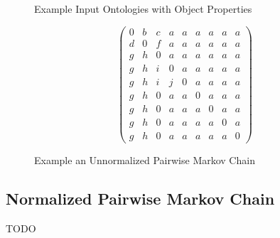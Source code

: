 \documentclass[letterpaper,twocolumn,12pt]{article}
\begin{document}
\begin{figure*}
\centering
\SetVertexNormal[
	Shape = circle,
    LineWidth = 1pt
]
\SetUpEdge[
	lw = 1pt,
    color = orange,
    labelcolor = white
]
\caption{Example Input Ontologies with Object Properties}
\label{fig:input}
\end{figure*}

\begin{figure*}
\begin{equation*}
\left( \begin{array}{ccccccccc}
0 & b & c & a & a & a & a & a & a \\
d & 0 & f & a & a & a & a & a & a \\
g & h & 0 & a & a & a & a & a & a \\
g & h & i & 0 & a & a & a & a & a \\
g & h & i & j & 0 & a & a & a & a \\
g & h & 0 & a & a & 0 & a & a & a \\
g & h & 0 & a & a & a & 0 & a & a \\
g & h & 0 & a & a & a & a & 0 & a \\
g & h & 0 & a & a & a & a & a & 0 \end{array} \right)
\end{equation*}
\caption{Example an Unnormalized Pairwise Markov Chain}
\label{fig:upmc}
\end{figure*}


\subsection{Normalized Pairwise Markov Chain}
TODO
\end{document}
